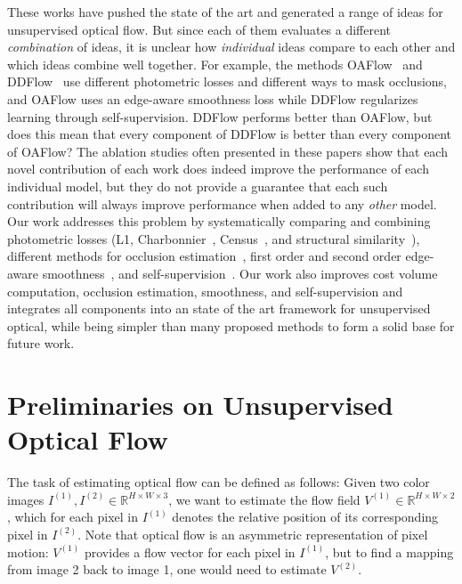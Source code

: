 \documentclass[runningheads]{llncs}
\begin{document}
These works have pushed the state of the art and generated a range of ideas for unsupervised optical flow. But since each of them evaluates a different \emph{combination} of ideas, it is unclear how \emph{individual} ideas compare to each other and which ideas combine well together. For example, the methods OAFlow~\cite{wang2018occlusion} and DDFlow~\cite{DDFlow} use different photometric losses and different ways to mask occlusions, and OAFlow uses an edge-aware smoothness loss while DDFlow regularizes learning through self-supervision. DDFlow performs better than OAFlow, but does this mean that every component of DDFlow is better than every component of OAFlow?
The ablation studies often presented in these papers show that each novel contribution of each work does indeed improve the performance of each individual model, but they do not provide a guarantee that each such contribution will always improve performance when added to any \emph{other} model.
Our work addresses this problem by systematically comparing and combining photometric losses (L1, Charbonnier~\cite{Sun2010}, Census~\cite{DDFlow,meister2018unflow,Zhong2019UnsupervisedDE,zou2018dfnet}, and structural similarity~\cite{ranjan2019cvpr,wang2018unos,yin2018geonet}), different methods for occlusion estimation~\cite{Brox04,wang2018occlusion}, first order and second order edge-aware smoothness~\cite{tomasi1998bilateral}, and self-supervision~\cite{DDFlow}. Our work also improves cost volume computation, occlusion estimation, smoothness, and self-supervision and integrates all components into an state of the art framework for unsupervised optical, while being simpler than many proposed methods to form a solid base for future work.

\section{Preliminaries on Unsupervised Optical Flow}

The task of estimating optical flow can be defined as follows: Given two color images $I^{(1)}, I^{(2)} \in \mathbb{R}^{H \times W \times 3}$, we want to estimate the flow field $V^{(1)}\in \mathbb{R}^{H \times W \times 2}$, which for each pixel in $I^{(1)}$ denotes the relative position of its corresponding pixel in $I^{(2)}$. Note that optical flow is an asymmetric representation of pixel motion: $V^{(1)}$ provides a flow vector for each pixel in $I^{(1)}$, but to find a mapping from image 2 back to image 1, one would need to estimate $V^{(2)}$.
\end{document}
